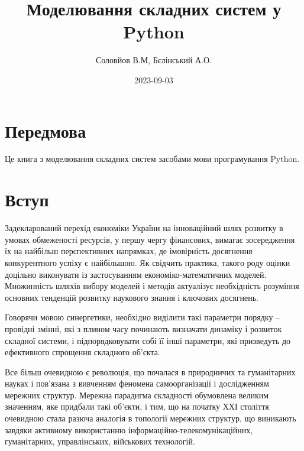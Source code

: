 \documentclass[
  letterpaper,
]{report}
\title{Моделювання складних систем у Python}
\author{Соловйов В.М, Бєлінський А.О.}
\date{2023-09-03}
\renewcommand*\contentsname{Зміст}
\newcommand\contentsname{Зміст}
\begin{document}
\maketitle
\ifdefined\Shaded\renewenvironment{Shaded}{\begin{tcolorbox}[interior hidden, borderline west={3pt}{0pt}{shadecolor}, sharp corners, breakable, boxrule=0pt, enhanced, frame hidden]}{\end{tcolorbox}}\fi

\renewcommand*\contentsname{Зміст}
{
\hypersetup{linkcolor=}
\setcounter{tocdepth}{2}
\tableofcontents
}

\hypertarget{ux43fux435ux440ux435ux434ux43cux43eux432ux430}{%
\chapter*{Передмова}\label{ux43fux435ux440ux435ux434ux43cux43eux432ux430}}


Це книга з моделювання складних систем засобами мови програмування
Python.


\hypertarget{ux432ux441ux442ux443ux43f}{%
\chapter{Вступ}\label{ux432ux441ux442ux443ux43f}}

Задекларований перехід економіки України на інноваційний шлях розвитку в
умовах обмеженості ресурсів, у першу чергу фінансових, вимагає
зосередження їх на найбільш перспективних напрямках, де імовірність
досягнення конкурентного успіху є найбільшою. Як свідчить практика,
такого роду оцінки доцільно виконувати із застосуванням
економіко-математичних моделей. Множинність шляхів вибору моделей і
методів актуалізує необхідність розуміння основних тенденцій розвитку
наукового знання і ключових досягнень.

Говорячи мовою синергетики, необхідно виділити такі параметри порядку --
провідні змінні, які з плином часу починають визначати динаміку і
розвиток складної системи, і підпорядковувати собі її інші параметри,
які призведуть до ефективного спрощення складного об'єкта.

Все більш очевидною є революція, що почалася в природничих та
гуманітарних науках і пов'язана з вивченням феномена самоорганізації і
дослідженням мережних структур. Мережна парадигма складності обумовлена
великим значенням, яке придбали такі об'єкти, і тим, що на початку ХХІ
століття очевидною стала разюча аналогія в топології мережних структур,
що виникають завдяки активному використанню
інформаційно-телекомунікаційних, гуманітарних, управлінських, військових
технологій.
\end{document}
